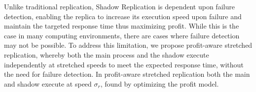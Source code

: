 Unlike traditional replication, 
Shadow Replication is dependent upon failure detection, enabling the
replica to increase its execution speed upon failure and maintain the
targeted response time thus maximizing profit. While this is the case
in many computing environments, there are cases where failure
detection may not be possible. To address this limitation, we propose
profit-aware stretched replication, whereby both the main process and
the shadow execute independently at stretched speeds to meet the
expected response time, without the need for failure
detection. In profit-aware stretched replication both the main and
shadow execute at speed $\sigma_r$, found by optimizing the profit
model.  
%
%
%
%
%
%
